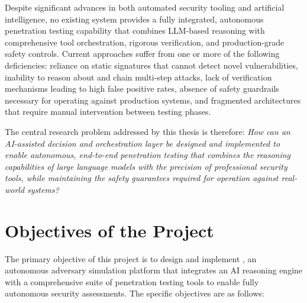 Despite significant advances in both automated security tooling and artificial intelligence, no existing system provides a fully integrated, autonomous penetration testing capability that combines LLM-based reasoning with comprehensive tool orchestration, rigorous verification, and production-grade safety controls. Current approaches suffer from one or more of the following deficiencies: reliance on static signatures that cannot detect novel vulnerabilities, inability to reason about and chain multi-step attacks, lack of verification mechanisms leading to high false positive rates, absence of safety guardrails necessary for operating against production systems, and fragmented architectures that require manual intervention between testing phases.

The central research problem addressed by this thesis is therefore: \textit{How can an AI-assisted decision and orchestration layer be designed and implemented to enable autonomous, end-to-end penetration testing that combines the reasoning capabilities of large language models with the precision of professional security tools, while maintaining the safety guarantees required for operation against real-world systems?}

\section{Objectives of the Project}
\label{sec:objectives}

The primary objective of this project is to design and implement , an autonomous adversary simulation platform that integrates an AI reasoning engine with a comprehensive suite of penetration testing tools to enable fully autonomous security assessments. The specific objectives are as follows:

